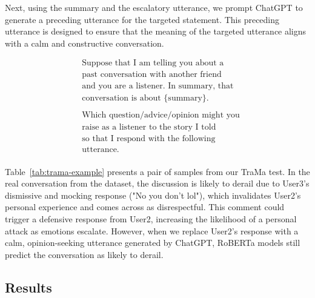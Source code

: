 Next, using the summary and the escalatory utterance, we prompt ChatGPT to generate a preceding utterance for the targeted statement. This preceding utterance is designed to ensure that the meaning of the targeted utterance aligns with a calm and constructive conversation.

{\ttfamily
\begin{align*}
& \text{Suppose that I am telling you about a}\\
& \text{past conversation with another friend}\\
& \text{and you are a listener. In summary, that}\\ 
& \text{conversation is about \{summary\}.}\\
& \\
& \text{Which question/advice/opinion might you}\\
& \text{raise as a listener to the story I told}\\ 
& \text{so that I respond with the following}\\ 
& \text{utterance.}\\ 
\end{align*}
}

Table~\ref{tab:trama-example} presents a pair of samples from our TraMa test. 
In the real conversation from the dataset, the discussion is likely to derail due to User3's dismissive and mocking response ("No you don't lol"), which invalidates User2's personal experience and comes across as disrespectful. 
This comment could trigger a defensive response from User2, increasing the likelihood of a personal attack as emotions escalate. 
However, when we replace User2's response with a calm, opinion-seeking utterance generated by ChatGPT, RoBERTa models still predict the conversation as likely to derail.



\subsection{Results}

